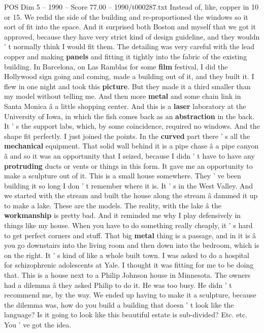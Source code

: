 \begin{textsample}{POS Dim 5 – 1990 – Score 77.00 – 1990/t000287.txt}
Instead of, like, copper in 10 or 15.
We redid the side of the building and re-proportioned the windows so it sort of fit into the space.
And it surprised both Boston and myself that we got it approved, because they have very strict kind of design guideline, and they wouldn ' t normally think I would fit them.
The detailing was very careful with the lead copper and making \textbf{panels} and fitting it tightly into the fabric of the existing building.
In Barcelona, on Las Ramblas for some \textbf{film} festival, I did the Hollywood sign going and coming, made a building out of it, and they built it.
I flew in one night and took this \textbf{picture}.
But they made it a third smaller than my model without telling me.
And then more \textbf{metal} and some chain link in Santa Monica â a little shopping center.
And this is a \textbf{laser} laboratory at the University of Iowa, in which the fish comes back as an \textbf{abstraction} in the back.
It ' s the support labs, which, by some coincidence, required no windows.
And the shape fit perfectly.
I just joined the points.
In the \textbf{curved} part there ' s all the \textbf{mechanical} equipment.
That solid wall behind it is a pipe chase â a pipe canyon â and so it was an opportunity that I seized, because I didn ' t have to have any \textbf{protruding} ducts or vents or things in this form.
It gave me an opportunity to make a sculpture out of it.
This is a small house somewhere.
They ' ve been building it so long I don ' t remember where it is.
It ' s in the West Valley.
And we started with the stream and built the house along the stream â dammed it up to make a lake.
These are the models.
The reality, with the lake â the \textbf{workmanship} is pretty bad.
And it reminded me why I play defensively in things like my house.
When you have to do something really cheaply, it ' s hard to get perfect corners and stuff.
That big \textbf{metal} thing is a passage, and in it is â you go downstairs into the living room and then down into the bedroom, which is on the right.
It ' s kind of like a whole built town.
I was asked to do a hospital for schizophrenic adolescents at Yale.
I thought it was fitting for me to be doing that.
This is a house next to a Philip Johnson house in Minnesota.
The owners had a dilemma â they asked Philip to do it.
He was too busy.
He didn ' t recommend me, by the way.
We ended up having to make it a sculpture, because the dilemma was, how do you build a building that doesn ' t look like the language?
Is it going to look like this beautiful estate is sub-divided?
Etc. etc.
You ' ve got the idea.

\end{textsample}
